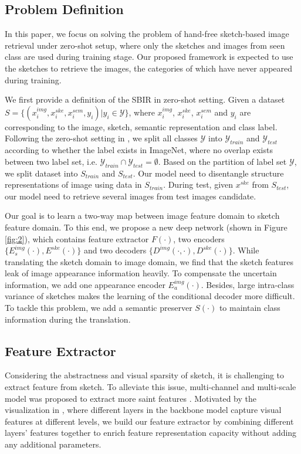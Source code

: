 \documentclass[10pt,twocolumn,letterpaper]{article}
\begin{document}
\subsection{Problem Definition} \label{3.1}
In this paper, we focus on solving the problem of hand-free sketch-based image retrieval under zero-shot setup, where only the sketches and images from seen class are used during training stage. 
Our proposed framework is expected to use the sketches to retrieve the images, the categories of which have never appeared during training.

We first provide a definition of the SBIR in zero-shot setting. 
Given a dataset $S=\{(x_i^{img}, x_i^{ske}, x_i^{sem}, y_i)|y_i \in \mathcal{Y}\}$, where $x_i^{img}$, $x_i^{ske}$, $x_i^{sem}$ and $y_i$ are corresponding to the image, sketch, semantic representation and class label. 
Following the zero-shot setting in \cite{yelamarthi2018zero}, we split all classes $\mathcal{Y}$ into $\mathcal{Y}_{train}$ and $\mathcal{Y}_{test}$ according to whether the label exists in ImageNet\cite{deng2009imagenet}, where no overlap exists between two label set, i.e. $\mathcal{Y}_{train} \cap \mathcal{Y}_{test} = \emptyset$. 
Based on the partition of label set $\mathcal{Y}$, we split dataset into $S_{train}$ and $S_{test}$. 
Our model need to disentangle structure representations of image using data in $S_{train}$. 
During test, given $x^{ske}$ from $S_{test}$, our model need to retrieve several images from test images candidate.

Our goal is to learn a two-way map between image feature domain to sketch feature domain. 
To this end, we propose a new deep network (shown in Figure \ref{fig:2}), which contains feature extractor $F(\cdot)$, two encoders $\{E_{s}^{img}(\cdot), E^{ske}(\cdot)\}$ and two decoders $\{D^{img}(\cdot, \cdot), D^{ske}(\cdot)\}$. While translating the sketch domain to image domain, we find that the sketch features leak of image appearance information heavily. To compensate the uncertain information, we add one appearance encoder $E^{img}_{a}(\cdot)$. Besides, large intra-class variance of sketches makes the learning of the conditional decoder more difficult. To tackle this problem,  we add a semantic preserver $S(\cdot)$ to maintain class information during the translation. 

\subsection{Feature Extractor} \label{3.2}
Considering the abstractness and visual sparsity of sketch, it is challenging to extract feature from sketch. 
To alleviate this issue, multi-channel and multi-scale model was proposed to extract more saint features \cite{yu2017sketch}. 
Motivated by the visualization in \cite{zeiler2014visualizing}, where different layers in the backbone model capture visual features at different levels, we build our feature extractor by combining different layers' features together to enrich feature representation capacity without adding any additional parameters.
\end{document}
